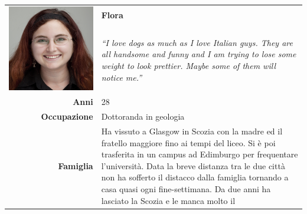 \begin{table}[H]
	\begin{centering}
	\begin{tabular} { | r  p{12cm} | }
		\hline
		\multirow{2}{*}{
			\begin{minipage}{.15 \textheight}
				\vspace{0.1in}
				\includegraphics[width=\linewidth]{img/personas/flora.png}
			\end{minipage}
		}
		 & \vspace{0.1 in}\Large\textbf{Flora} \\ 
		& \vspace{0.1 in}\large{\emph{``I love dogs as much as I
love Italian guys. They are all handsome and funny and I am trying to
	lose some weight to look prettier. Maybe some of them will notice
me.''}}\\[8ex] 
		\hline
		\textbf{Anni} & 28 \\ \hline
		\textbf{Occupazione} & Dottoranda in geologia \\ \hline
		\textbf{Famiglia} & {Ha vissuto a Glasgow in Scozia con la madre
ed il fratello maggiore fino ai tempi del liceo. Si è poi trasferita in
un campus ad
Edimburgo per frequentare l'università. Data la breve distanza tra le
due città non ha sofferto il distacco dalla famiglia tornando a casa
quasi ogni fine-settimana. Da due anni ha lasciato la Scozia e le manca molto il
}
\end{tabular}
\end{centering}
\end{table}
